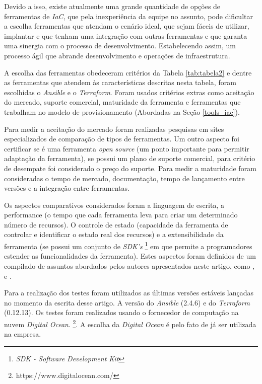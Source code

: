 Devido a isso, existe atualmente uma grande quantidade de opções de ferramentas de \textit{IaC}, que pela inexperiência da equipe no assunto, pode dificultar a escolha ferramentas que atendam o cenário ideal, que sejam fáceis de utilizar, implantar e que tenham uma integração com outras ferramentas e que garanta uma sinergia com o processo de desenvolvimento. Estabelecendo assim, um processo ágil que abrande desenvolvimento e operações de infraestrutura.  

A escolha das ferramentas obedeceram critérios da Tabela \ref{tab:tabela2} e dentre as ferramentas que atendem às características descritas nesta tabela, foram escolhidas o \textit{Ansible} e o \textit{Terraform}. Foram usados critérios extras como aceitação do mercado, suporte comercial, maturidade da ferramenta e ferramentas que trabalham no modelo de provisionamento (Abordadas na Seção \ref{tools_iac}).

Para medir a aceitação do mercado foram realizadas pesquisas em sites especializados de comparação de tipos de ferramentas. Um outro aspecto foi certificar se é uma ferramenta \textit{open source} (um ponto importante para permitir adaptação da ferramenta), se possui um plano de suporte comercial, para critério de desempate foi considerado o preço do suporte. Para medir a maturidade foram consideradas o tempo de mercado, documentação, tempo de lançamento entre versões e a integração entre ferramentas.

Os aspectos comparativos considerados foram a linguagem de escrita, a performance (o tempo que cada ferramenta leva para criar um determinado número de recursos). O controle de estado (capacidade da ferramenta  de controlar e identificar o estado real dos recursos) e a extensibilidade da ferramenta (se possui um conjunto de \textit{SDK's} \footnote{\textit{SDK - Software Development Kit}} em que permite a programadores estender as funcionalidades da ferramenta).  Estes aspectos foram definidos de um compilado de assuntos abordados pelos autores apresentados neste artigo, como \cite{steve}, \cite{masek} e \cite{Morris:2016:ICM:3006361}.

Para a realização dos testes foram utilizados as últimas versões estáveis lançadas no momento da escrita desse artigo. A versão do \textit{Ansible} (2.4.6) e do \textit{Terraform} (0.12.13). Os testes foram realizados usando o fornecedor de computação na nuvem \textit{Digital Ocean}. \footnote{https://www.digitalocean.com/}. A escolha da \textit{Digital Ocean} é pelo fato de já ser utilizada na empresa. 

